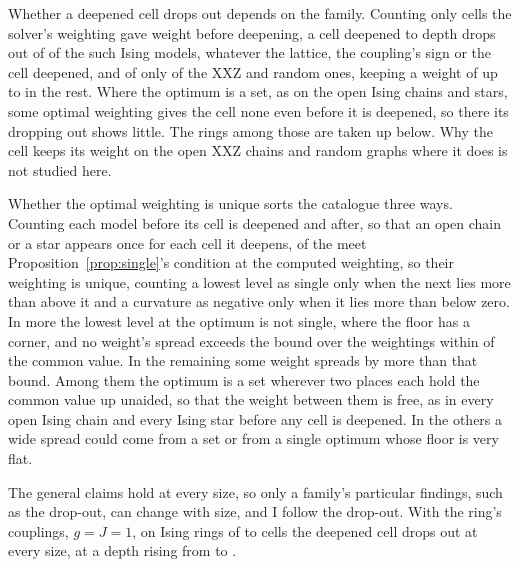 \documentclass[aps,prd,reprint,superscriptaddress]{revtex4-2}
\begin{document}
Whether a deepened cell drops out depends on the family. Counting only cells the solver's weighting gave weight before deepening, a cell deepened to depth  drops out of  of the  such Ising models, whatever the lattice, the coupling's sign or the cell deepened, and of only  of the  XXZ and random ones, keeping a weight of up to  in the rest. Where the optimum is a set, as on the open Ising chains and stars, some optimal weighting gives the cell none even before it is deepened, so there its dropping out shows little. The rings among those are taken up below. Why the cell keeps its weight on the open XXZ chains and random graphs where it does is not studied here.

Whether the optimal weighting is unique sorts the catalogue three ways. Counting each model before its cell is deepened and after, so that an open chain or a star appears once for each cell it deepens,  of the  meet Proposition~\ref{prop:single}'s condition at the computed weighting, so their weighting is unique, counting a lowest level as single only when the next lies more than  above it and a curvature as negative only when it lies more than  below zero. In  more the lowest level at the optimum is not single, where the floor has a corner, and no weight's spread exceeds the bound  over the weightings within  of the common value. In the remaining  some weight spreads by more than that bound. Among them the optimum is a set wherever two places each hold the common value up unaided, so that the weight between them is free, as in every open Ising chain and every Ising star before any cell is deepened. In the others a wide spread could come from a set or from a single optimum whose floor is very flat.

The general claims hold at every size, so only a family's particular findings, such as the drop-out, can change with size, and I follow the drop-out. With the ring's couplings, $g = J = 1$, on Ising rings of  to  cells the deepened cell drops out at every size, at a depth rising from  to .
\end{document}
